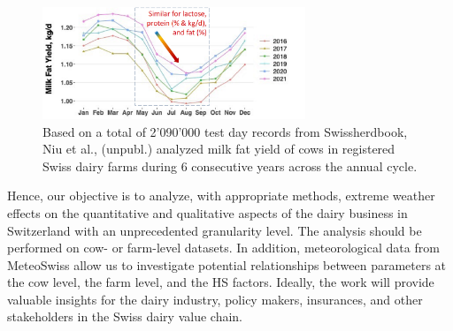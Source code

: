 \begin{figure}[H]
    \centering
    \includegraphics[width=0.7\textwidth]{./thesis/figures/project_description.png}
    \renewcommand{\thefigure}{A}
    \caption{Based on a total of 2'090'000 test day records from Swissherdbook, Niu et al., (unpubl.) analyzed milk fat yield of cows in registered Swiss dairy farms during 6 consecutive years across the annual cycle.}
    \label{fig:niu_annual_seasonality}
\end{figure}

Hence, our objective is to analyze, with appropriate methods, extreme weather effects on the quantitative and qualitative aspects of the dairy business in Switzerland with an unprecedented granularity level. The analysis should be performed on cow- or farm-level datasets. In addition, meteorological data from MeteoSwiss \citep{meteoswiss} allow us to investigate potential relationships between parameters at the cow level, the farm level, and the HS factors. Ideally, the work will provide valuable insights for the dairy industry, policy makers, insurances, and other stakeholders in the Swiss dairy value chain.
